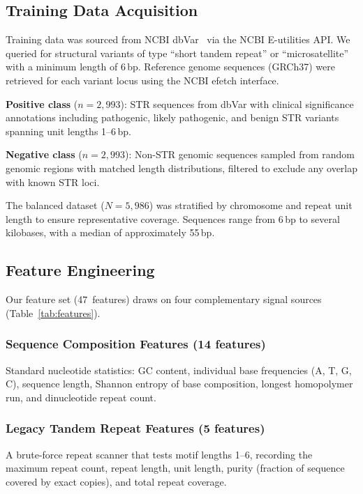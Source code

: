 \documentclass[11pt,twocolumn]{article}
\begin{document}
\subsection{Training Data Acquisition}\label{sec:data}

Training data was sourced from NCBI dbVar~\citep{lappalainen2013} via
the NCBI E-utilities API.  We queried for structural variants of type
``short tandem repeat'' or ``microsatellite'' with a minimum length of
6\,bp.  Reference genome sequences (GRCh37) were retrieved for each
variant locus using the NCBI efetch interface.

\textbf{Positive class} ($n = 2{,}993$): STR sequences from dbVar
with clinical significance annotations including pathogenic, likely
pathogenic, and benign STR variants spanning unit lengths 1--6\,bp.

\textbf{Negative class} ($n = 2{,}993$): Non-STR genomic sequences
sampled from random genomic regions with matched length distributions,
filtered to exclude any overlap with known STR loci.

The balanced dataset ($N = 5{,}986$) was stratified by chromosome and
repeat unit length to ensure representative coverage.  Sequences range
from 6\,bp to several kilobases, with a median of approximately 55\,bp.

\subsection{Feature Engineering}\label{sec:features}

Our feature set (47~features) draws on four complementary signal
sources (Table~\ref{tab:features}).

\subsubsection{Sequence Composition Features (14 features)}
Standard nucleotide statistics: GC content, individual base frequencies
(A, T, G, C), sequence length, Shannon entropy of base composition,
longest homopolymer run, and dinucleotide repeat count.

\subsubsection{Legacy Tandem Repeat Features (5 features)}
A brute-force repeat scanner that tests motif lengths 1--6, recording
the maximum repeat count, repeat length, unit length, purity (fraction
of sequence covered by exact copies), and total repeat coverage.
\end{document}
